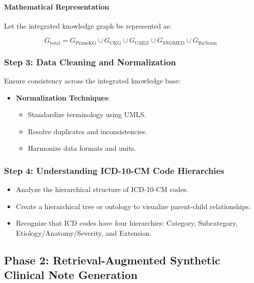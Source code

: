 \documentclass[12pt, a4paper]{article}
\begin{document}
\paragraph{Mathematical Representation}

Let the integrated knowledge graph be represented as:

\begin{equation}
G_{\text{total}} = G_{\text{PrimeKG}} \cup G_{\text{CKG}} \cup G_{\text{UMLS}} \cup G_{\text{SNOMED}} \cup G_{\text{RxNorm}}
\end{equation}

\subsubsection{Step 3: Data Cleaning and Normalization}

Ensure consistency across the integrated knowledge base:

\begin{itemize}
    \item \textbf{Normalization Techniques}:
    \begin{itemize}
        \item Standardize terminology using UMLS.
        \item Resolve duplicates and inconsistencies.
        \item Harmonize data formats and units.
    \end{itemize}
\end{itemize}

\subsubsection{Step 4: Understanding ICD-10-CM Code Hierarchies}

\begin{itemize}
    \item Analyze the hierarchical structure of ICD-10-CM codes.
    \item Create a hierarchical tree or ontology to visualize parent-child relationships.
    \item Recognize that ICD codes have four hierarchies: Category, Subcategory, Etiology/Anatomy/Severity, and Extension.
\end{itemize}

\subsection{Phase 2: Retrieval-Augmented Synthetic Clinical Note Generation}
\end{document}
